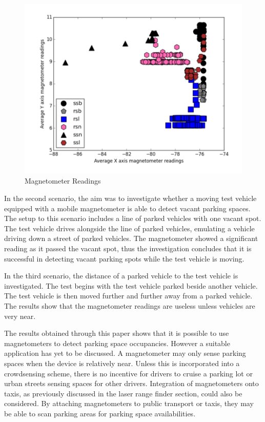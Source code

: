 \begin{figure}[H]
    \centering
    \includegraphics[width=0.75\linewidth]{./Images/MAGNETOMETER.PNG}
    \caption{Magnetometer Readings}
    \label{figure:magnetometer}
\end{figure}

In the second scenario, the aim was to investigate whether a moving test vehicle equipped with a mobile magnetometer is able to detect vacant parking spaces. The setup to this scenario includes a line of parked vehicles with one vacant spot. The test vehicle drives alongside the line of parked vehicles, emulating a vehicle driving down a street of parked vehicles. The magnetometer showed a significant reading as it passed the vacant spot, thus the investigation concludes that it is successful in detecting vacant parking spots while the test vehicle is moving.

In the third scenario, the distance of a parked vehicle to the test vehicle is investigated. The test begins with the test vehicle parked beside another vehicle. The test vehicle is then moved further and further away from a parked vehicle. The results show that the magnetometer readings are useless unless vehicles are very near.

The results obtained through this paper shows that it is possible to use magnetometers to detect parking space occupancies. However a suitable application has yet to be discussed. A magnetometer may only sense parking spaces when the device is relatively near. Unless this is incorporated into a crowdsensing scheme, there is no incentive for drivers to cruise a parking lot or urban streets sensing spaces for other drivers. Integration of magnetometers onto taxis, as previously discussed in the laser range finder section, could also be considered. By attaching magnetometers to public transport or taxis, they may be able to scan parking areas for parking space availabilities.